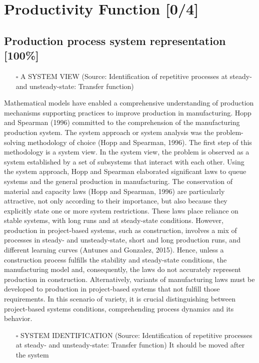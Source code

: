 \documentclass{article}
\begin{document}
\section{Productivity Function [0/4]}
\label{sec:org922e55f}
\subsection{Production process system representation [100\%]}
\label{sec:orgfd44def}

\begin{itemize}
\item[{$\square$}] A SYSTEM VIEW (Source: Identification of repetitive processes at steady- and unsteady-state: Transfer function)
\end{itemize}

Mathematical models have enabled a comprehensive understanding of production mechanisms supporting practices to improve production in manufacturing.
Hopp and Spearman (1996) committed to the comprehension of the manufacturing production system.
The system approach or system analysis was the problem-solving methodology of choice (Hopp and Spearman, 1996).
The first step of this methodology is a system view.
In the system view, the problem is observed as a system established by a set of subsystems that interact with each other.
Using the system approach, Hopp and Spearman elaborated significant laws to queue systems and the general production in manufacturing.
The conservation of material and capacity laws (Hopp and Spearman, 1996) are particularly attractive, not only according to their importance, but also because they explicitly state one or more system restrictions.
These laws place reliance on stable systems, with long runs and at steady-state conditions. However, production in project-based systems, such as construction, involves a mix of processes in steady- and unsteady-state, short and long production runs, and different learning curves (Antunes and Gonzalez, 2015).
Hence, unless a construction process fulfills the stability and steady-state conditions, the manufacturing model and, consequently, the laws do not accurately represent production in construction. Alternatively, variants of manufacturing laws must be developed to production in project-based systems that not fulfill those requirements.
In this scenario of variety, it is crucial distinguishing between project-based systems conditions, comprehending process dynamics and its behavior.


\begin{itemize}
\item[{$\square$}] SYSTEM IDENTIFICATION (Source: Identification of repetitive processes at steady- and unsteady-state: Transfer function)
It should be moved after the system
\end{itemize}
\end{document}
